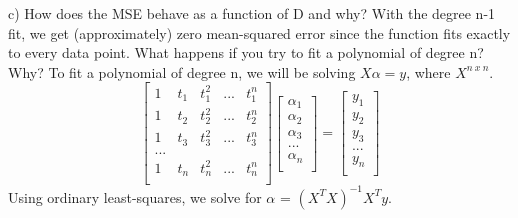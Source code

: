 \documentclass[11pt]{article}
\newenvironment{problem}[2][Problem]{\begin{trivlist}
\item[\hskip \labelsep {\bfseries #1}\hskip \labelsep {\bfseries #2.}]}{\end{trivlist}}
\begin{document}
\begin{problem}{2.1}
(c) 
{\color{red} How does the MSE behave as a function of D and why?}
With the degree n-1 fit, we get (approximately) zero mean-squared error since the function fits exactly to every data point. 
{\color{red}What happens if you try to fit a polynomial of degree n? Why? To fit a polynomial of degree n, we will be solving $X\alpha = y$, where $X^{n~x~n}$.
\[
	\begin{bmatrix}
	1 & t_{1} & t^2_{1} & ... & t^n_{1}\\
	1 & t_{2} & t^2_{2} & ... & t^n_{2}\\
	1 & t_{3} & t^2_{3} & ... & t^n_{3}\\
	...\\
	1 & t_{n} & t^2_{n} & ... & t^n_{n}\\
	\end{bmatrix}
	\begin{bmatrix}
		\alpha_{1}\\
		\alpha_{2}\\
		\alpha_{3}\\
		...\\
		\alpha_{n}\\
	 \end{bmatrix}
=
	\begin{bmatrix}
		y_{1}\\
		y_{2}\\
		y_{3}\\
		...\\
		y_{n}\\
	 \end{bmatrix}
\]
Using ordinary least-squares, we solve for $\alpha$ = $(X^{T}X)^{-1}X^{T}y$.}


\end{problem}
\end{document}
